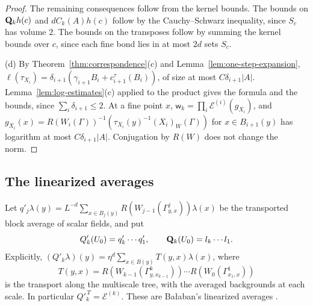 \begin{proof}
The remaining consequences follow from the kernel bounds. The bounds on $\mathbf Q_kh(c)$ and $dC_k(A)h(c)$ follow by the Cauchy--Schwarz inequality, since $S_c$ has volume $2$. The bounds on the transposes follow by summing the kernel bounds over $c$, since each fine bond lies in at most $2d$ sets $S_c$.

(d) By Theorem~\ref{thm:correspondence}(c) and Lemma~\ref{lem:one-step-expansion}, $\ell(\tau_{X_i})=\delta_{i+1}(\gamma_{i+1}B_i+c^\tau_{i+1}(B_i))$, of size at most $C\delta_{i+1}|A|$. Lemma~\ref{lem:log-estimates}(c) applied to the product gives the formula and the bounds, since $\sum_i\delta_{i+1}\le2$. At a fine point $x$, $\mathsf w_k=\prod_i\mathcal E^{(i)}(g_{X_i})$, and $g_{X_i}(x)=R(W_i(\Gamma))^{-1}(\tau_{X_i}(y)^{-1}(X_i)_W(\Gamma))$ for $x\in B_{i+1}(y)$ has logarithm at most $C\delta_{i+1}|A|$. Conjugation by $R(W)$ does not change the norm.
\end{proof}

\subsection{The linearized averages}

Let $q'_j\lambda(y)=L^{-d}\sum_{x\in B_j(y)}R(W_{j-1}(\Gamma^j_{y,x}))\lambda(x)$ be the transported block average of scalar fields, and put
\[
Q'_k(U_0)=q'_k\cdots q'_1,\qquad\mathbf Q_k(U_0)=l_k\cdots l_1 .
\]
Explicitly, $(Q'_k\lambda)(y)=\eta^d\sum_{x\in B(y)}T(y,x)\lambda(x)$, where
\[
T(y,x)=R(W_{k-1}(\Gamma^k_{y,x_{k-1}}))\cdots R(W_0(\Gamma^1_{x_1,x}))
\]
is the transport along the multiscale tree, with the averaged backgrounds at each scale. In particular $Q'^{\,T}_k=\mathcal E^{(k)}$. These are Ba\l aban's linearized averages \cite[(3.15)--(3.19)]{BalBackground}.

